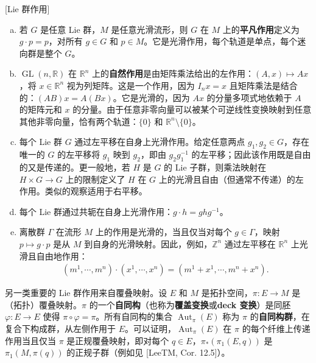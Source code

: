 \documentclass[../../main.tex]{subfiles}
\begin{document}
\begin{example}\label{example:ch07-22}[Lie 群作用]
\begin{enumerate}[(a)]
\item 若 $G$ 是任意 Lie 群，$M$ 是任意光滑流形，则 $G$ 在 $M$ 上的\textbf{平凡作用}定义为 $g\cdot p=p$，对所有 $g\in G$ 和 $p\in M$。它是光滑作用，每个轨道是单点，每个迷向群是整个 $G$。

\item $\operatorname{GL}(n,\mathbb{R})$ 在 $\mathbb{R}^n$ 上的\textbf{自然作用}是由矩阵乘法给出的左作用：$(A,x)\mapsto Ax$，将 $x\in\mathbb{R}^n$ 视为列矩阵。这是一个作用，因为 $I_n x=x$ 且矩阵乘法是结合的：$(AB)x=A(Bx)$。它是光滑的，因为 $Ax$ 的分量多项式地依赖于 $A$ 的矩阵元和 $x$ 的分量。由于任意非零向量可以被某个可逆线性变换映射到任意其他非零向量，恰有两个轨道：$\{0\}$ 和 $\mathbb{R}^n\setminus\{0\}$。

\item 每个 Lie 群 $G$ 通过左平移在自身上光滑作用。给定任意两点 $g_1,g_2\in G$，存在唯一的 $G$ 的左平移将 $g_1$ 映到 $g_2$，即由 $g_2g_1^{-1}$ 的左平移；因此该作用既是自由的又是传递的。更一般地，若 $H$ 是 $G$ 的 Lie 子群，则乘法映射在 $H\times G\to G$ 上的限制定义了 $H$ 在 $G$ 上的光滑且自由（但通常不传递）的左作用。类似的观察适用于右平移。

\item 每个 Lie 群通过共轭在自身上光滑作用：$g\cdot h=ghg^{-1}$。

\item 离散群 $\Gamma$ 在流形 $M$ 上的作用是光滑的，当且仅当对每个 $g\in\Gamma$，映射 $p\mapsto g\cdot p$ 是从 $M$ 到自身的光滑映射。因此，例如，$\mathbb{Z}^n$ 通过左平移在 $\mathbb{R}^n$ 上光滑且自由地作用：
\begin{align*}
(m^1,\cdots ,m^n)\cdot(x^1,\cdots ,x^n)=(m^1+x^1,\cdots ,m^n+x^n).
\end{align*}
\end{enumerate}
\end{example}

另一类重要的 Lie 群作用来自覆叠映射。设 $E$ 和 $M$ 是拓扑空间，$\pi\colon E\to M$ 是（拓扑）覆叠映射。$\pi$ 的一个\textbf{自同构}（也称为\textbf{覆盖变换}或\textbf{deck 变换}）是同胚 $\varphi\colon E\to E$ 使得 $\pi\circ\varphi=\pi$。所有自同构的集合 $\operatorname{Aut}_\pi(E)$ 称为 $\pi$ 的\textbf{自同构群}，在复合下构成群，从左侧作用于 $E$。可以证明，$\operatorname{Aut}_\pi(E)$ 在 $\pi$ 的每个纤维上传递作用当且仅当 $\pi$ 是正规覆叠映射，即对每个 $q\in E$，$\pi_*(\pi_1(E,q))$ 是 $\pi_1(M,\pi(q))$ 的正规子群（例如见 [LeeTM, Cor. 12.5]）。
\end{document}
